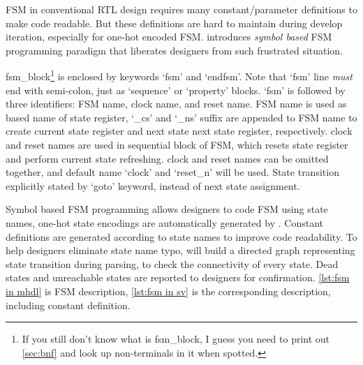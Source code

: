 FSM in conventional RTL design requires many
constant/parameter definitions to make code readable. But these
definitions are hard to maintain during develop iteration, especially
for one-hot encoded FSM. \mhdl{} introduces \emph{symbol based} FSM
programming paradigm that liberates designers from such frustrated
situation.

fsm\_block\footnote{If you still don't know what is fsm\_block, I
guess you need to print out
\autoref{sec:bnf} and look up non-terminals in it when spotted.}
is enclosed by keywords `fsm' and `endfsm'. Note that `fsm'
line \emph{must} end with semi-colon, just as \sv{} `sequence' or
`property' blocks. `fsm' is followed by three identifiers: FSM name,
clock name, and reset name. FSM name is used as based name of state
register, `\_cs' and `\_ns' suffix are appended to FSM name to create
current state register and next state next state register,
respectively. clock and reset names are used in sequential block of
FSM, which resets state register and perform current state
refreshing. clock and reset names can be omitted together, and default
name `clock' and `reset\_n' will be used. State transition explicitly
stated by `goto' keyword, instead of next state assignment.

Symbol based FSM programming allows designers to code FSM using
state names, one-hot state encodings are automatically generated
by \mhdlc{}. Constant definitions are generated according to state
names to improve code readability. To help designers eliminate state
name typo, \mhdlc{} will build a directed graph representing state
transition during parsing, to check the connectivity of every state. Dead
states and unreachable states are reported to designers for
confirmation. \autoref{lst:fsm in mhdl} is \mhdl{} FSM description,
\autoref{lst:fsm in sv} is the corresponding \sv{} description, including
constant definition. 

